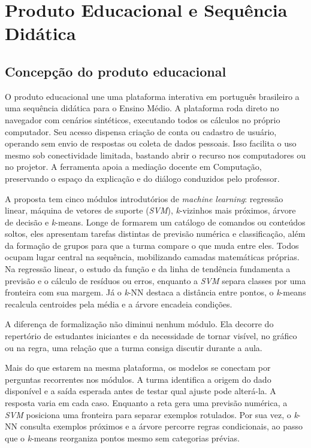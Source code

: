 \chapter{Produto Educacional e Sequência Didática}

\section{Concepção do produto educacional}

O produto educacional une uma plataforma interativa em português brasileiro a uma sequência didática para o Ensino Médio. A plataforma roda direto no navegador com cenários sintéticos, executando todos os cálculos no próprio computador. Seu acesso dispensa criação de conta ou cadastro de usuário, operando sem envio de respostas ou coleta de dados pessoais. Isso facilita o uso mesmo sob conectividade limitada, bastando abrir o recurso nos computadores ou no projetor. A ferramenta apoia a mediação docente em Computação, preservando o espaço da explicação e do diálogo conduzidos pelo professor.

A proposta tem cinco módulos introdutórios de \textit{machine learning}: regressão linear, máquina de vetores de suporte (\textit{SVM}), \textit{k}-vizinhos mais próximos, árvore de decisão e \textit{k}-means. Longe de formarem um catálogo de comandos ou conteúdos soltos, eles apresentam tarefas distintas de previsão numérica e classificação, além da formação de grupos para que a turma compare o que muda entre eles. Todos ocupam lugar central na sequência, mobilizando camadas matemáticas próprias. Na regressão linear, o estudo da função e da linha de tendência fundamenta a previsão e o cálculo de resíduos ou erros, enquanto a \textit{SVM} separa classes por uma fronteira com sua margem. Já o \textit{k}-NN destaca a distância entre pontos, o \textit{k}-means recalcula centroides pela média e a árvore encadeia condições.

A diferença de formalização não diminui nenhum módulo. Ela decorre do repertório de estudantes iniciantes e da necessidade de tornar visível, no gráfico ou na regra, uma relação que a turma consiga discutir durante a aula.

Mais do que estarem na mesma plataforma, os modelos se conectam por perguntas recorrentes nos módulos. A turma identifica a origem do dado disponível e a saída esperada antes de testar qual ajuste pode alterá-la. A resposta varia em cada caso. Enquanto a reta gera uma previsão numérica, a \textit{SVM} posiciona uma fronteira para separar exemplos rotulados. Por sua vez, o \textit{k}-NN consulta exemplos próximos e a árvore percorre regras condicionais, ao passo que o \textit{k}-means reorganiza pontos mesmo sem categorias prévias.

